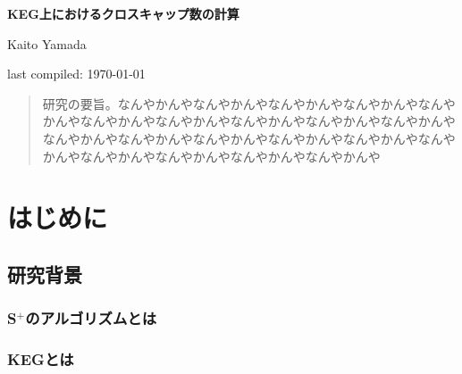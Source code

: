 \documentclass[11pt,a4j]{jsreport}
\newcommand{\splus}{S${}^\text{+}$}
\begin{document}
\thispagestyle{empty}
\begin{center}

\vspace{40mm}
{\huge\noindent\textbf{KEG上におけるクロスキャップ数の計算}}\\
\vspace{20mm}

{\Large\vspace{\baselineskip}
Kaito Yamada\\
}
\vspace{100mm}

last compiled: \today\\

\end{center}

\thispagestyle{empty}
\clearpage


\begin{abstract}
    研究の要旨。なんやかんやなんやかんやなんやかんやなんやかんやなんやかんやなんやかんやなんやかんやなんやかんやなんやかんやなんやかんやなんやかんやなんやかんやなんやかんやなんやかんやなんやかんやなんやかんやなんやかんやなんやかんやなんやかんやなんやかんや
\end{abstract}


\tableofcontents

\pagestyle{fancy}
\lhead{\rightmark}
\renewcommand{\chaptermark}[1]{\markboth{第\ \normalfont\thechapter\ 章~~#1}{}}


\chapter{はじめに} %

\section{研究背景} %
\subsection{\splus のアルゴリズムとは} %
\subsection{KEGとは} %
\end{document}

